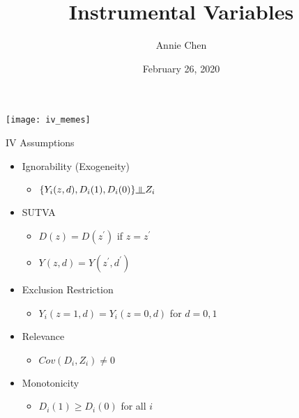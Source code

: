 \documentclass[ignorenonframetext,]{beamer}
\title{Instrumental Variables}
\author{Annie Chen}
\date{February 26, 2020}
\providecommand{\tightlist}{%
  \setlength{\itemsep}{0pt}\setlength{\parskip}{0pt}}
\newcommand{\indep}{\rotatebox[origin=c]{90}{$\models$}}
\begin{document}
\frame{\titlepage}

\begin{frame}{}

\begin{center}\texttt{[image: iv\_memes]} \end{center}

\end{frame}

\begin{frame}{IV Assumptions}

\color{red}{Which are directly testable from data?}

\begin{itemize}[<+->]
\tightlist
\item
  Ignorability (Exogeneity)

  \begin{itemize}[<+->]
  \tightlist
  \item
    \(\{Y_i(z,d),D_i(1),D_i(0)\}\indep Z_i\)
  \end{itemize}
\item
  SUTVA

  \begin{itemize}[<+->]
  \tightlist
  \item
    \(D(z) = D(z^{\prime})\) if \(z = z^{\prime}\)
  \item
    \(Y(z, d) = Y(z^{\prime}, d^{\prime})\)
  \end{itemize}
\item
  Exclusion Restriction

  \begin{itemize}[<+->]
  \tightlist
  \item
    \(Y_i(z = 1,d) = Y_i(z = 0,d)\) for \(d = 0,1\) 
  \end{itemize}
\item
  Relevance

  \begin{itemize}[<+->]
  \tightlist
  \item
    \(Cov(D_i, Z_i) \neq 0\)
  \end{itemize}
\item
  Monotonicity

  \begin{itemize}[<+->]
  \tightlist
  \item
    \(D_i(1) \geq D_i(0)\) for all \(i\)
  \end{itemize}
\end{itemize}

\end{frame}
\end{document}
